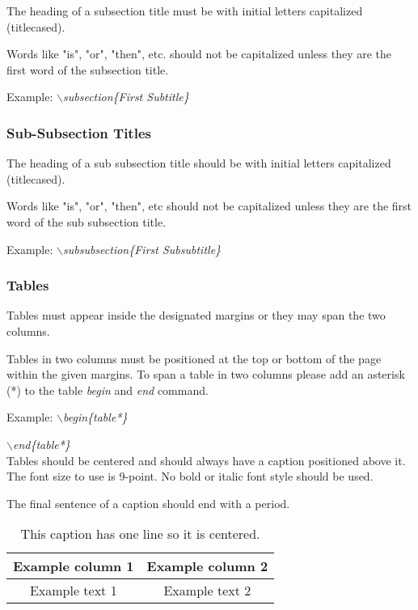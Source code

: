 \documentclass[a4paper,twoside]{article}
\begin{document}
The heading of a subsection title must be with initial letters
capitalized (titlecased).

Words like "is", "or", "then", etc. should not be capitalized unless
they are the first word of the subsection title.

Example: \textit{$\backslash$subsection\{First Subtitle\}}

\subsubsection{Sub-Subsection Titles}

The heading of a sub subsection title should be with initial letters
capitalized (titlecased).

Words like "is", "or", "then", etc should not be capitalized unless
they are the first word of the sub subsection title.

Example: \textit{$\backslash$subsubsection\{First Subsubtitle\}}

\subsubsection{Tables}

Tables must appear inside the designated margins or they may span
the two columns.

Tables in two columns must be positioned at the top or bottom of the
page within the given margins. To span a table in two columns please add an asterisk (*) to the table \textit{begin} and \textit{end} command.

Example: \textit{$\backslash$begin\{table*\}}

\hspace*{1.5cm}\textit{$\backslash$end\{table*\}}\\

Tables should be centered and should always have a caption
positioned above it. The font size to use is 9-point. No bold or
italic font style should be used.

The final sentence of a caption should end with a period.

\begin{table}[h]
\caption{This caption has one line so it is
centered.}\label{tab:example1} \centering
\begin{tabular}{|c|c|}
  \hline
  Example column 1 & Example column 2 \\
  \hline
  Example text 1 & Example text 2 \\
  \hline
\end{tabular}
\end{table}
\end{document}
